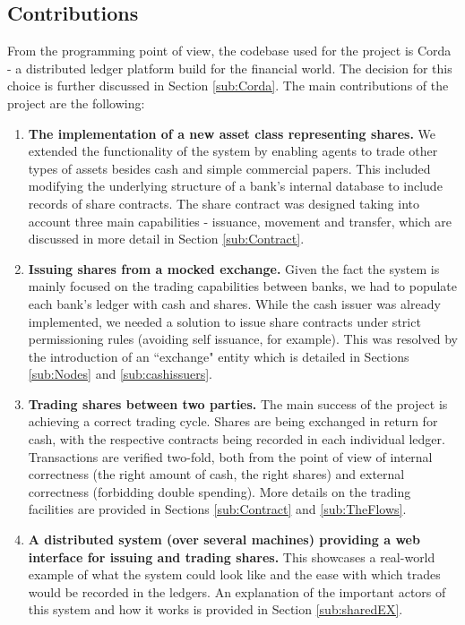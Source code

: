 \documentclass[12pt,twoside]{article}
\begin{document}
\subsection{Contributions}
\label{sec:Contributions}
From the programming point of view, the codebase used for the project is Corda - a distributed ledger platform build for the financial world. The decision for this choice is further discussed in Section \ref{sub:Corda}. The main contributions of the project are the following:
\begin{enumerate}
\item \textbf{The implementation of a new asset class representing shares.} We extended the functionality of the system by enabling agents to trade other types of assets besides cash and simple commercial papers. This included modifying the underlying structure of a bank's internal database to include records of share contracts. The share contract was designed taking into account three main capabilities - issuance, movement and transfer, which are discussed in more detail in Section \ref{sub:Contract}.
\item \textbf{Issuing shares from a mocked exchange.} Given the fact the system is mainly focused on the trading capabilities between banks, we had to populate each bank's ledger with cash and shares. While the cash issuer was already implemented, we needed a solution to issue share contracts under strict permissioning rules (avoiding self issuance, for example). This was resolved by the introduction of an ``exchange" entity which is detailed in Sections \ref{sub:Nodes} and \ref{sub:cashissuers}.
\item \textbf{Trading shares between two parties.} The main success of the project is achieving a correct trading cycle. Shares are being exchanged in return for cash, with the respective contracts being recorded in each individual ledger. Transactions are verified two-fold, both from the point of view of internal correctness (the right amount of cash, the right shares) and external correctness (forbidding double spending). More details on the trading facilities are provided in Sections \ref{sub:Contract} and \ref{sub:TheFlows}.
\item \textbf{A distributed system (over several machines) providing a web interface for issuing and trading shares.} This showcases a real-world example of what the system could look like and the ease with which trades would be recorded in the ledgers. An explanation of the important actors of this system and how it works is provided in Section \ref{sub:sharedEX}.

\end{enumerate}
\end{document}
